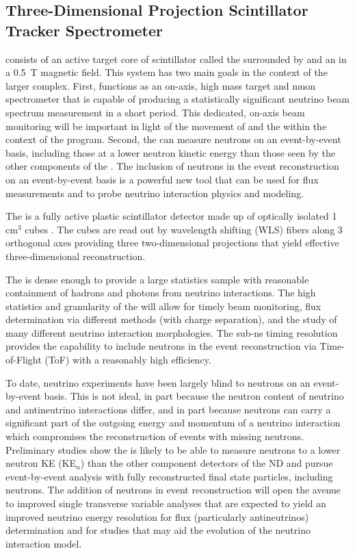 \subsection{Three-Dimensional Projection Scintillator Tracker Spectrometer}
\label{sec:appx-nd:mpt-3dst}

 consists of an active target core of scintillator called the  surrounded by  and an  in a \SI{0.5}{T} magnetic field.  This system has two main goals in the context of the larger  complex.  First,  functions as an on-axis, high mass target and muon spectrometer that is capable of producing a statistically significant neutrino beam spectrum measurement in a short period.  This dedicated, on-axis beam monitoring will be important in light of the movement of  and the  within the context of the  program.  Second, the  can measure neutrons on an event-by-event basis, including those at a lower neutron kinetic energy than those seen by the other components of the .  The inclusion of neutrons in the event reconstruction on an event-by-event basis is a powerful new tool that can be used for flux measurements and to probe neutrino interaction physics and modeling.



The  is a fully active plastic scintillator detector made up of optically isolated 1 cm$^{3}$ cubes \cite{Sgalaberna:2017khy}.  The cubes are read out by wavelength shifting (WLS) fibers along 3 orthogonal axes providing three two-dimensional projections that yield effective three-dimensional reconstruction.  


The  is dense enough to provide a large statistics sample with reasonable containment of hadrons and photons from neutrino interactions. The high statistics and granularity  of the  will allow for timely beam monitoring, flux determination via different methods (with charge separation), and the study of many different neutrino interaction morphologies.  The sub-ns timing resolution provides the  capability to include neutrons in the event reconstruction via Time-of-Flight (ToF) with a reasonably high efficiency.  

To date, neutrino experiments have been largely blind to neutrons on an event-by-event basis.  This is not ideal, in part because the neutron content of neutrino and antineutrino interactions differ, and in part because neutrons can carry a significant part of the outgoing energy and momentum of a neutrino interaction which compromises the reconstruction of events with missing neutrons.  Preliminary studies show the  is likely to be able to measure neutrons to a lower neutron KE (KE$_{n}$) than the other component detectors of the ND and pursue event-by-event analysis with fully reconstructed final state particles, including neutrons. The addition of neutrons in event reconstruction will open the avenue to improved single transverse variable analyses that are expected to yield an improved neutrino energy resolution for flux (particularly antineutrinos) determination and for studies that may aid the evolution of the neutrino interaction model.

